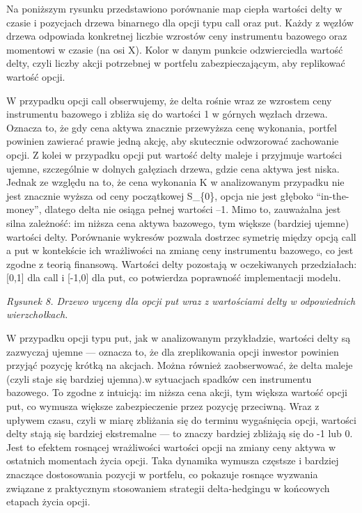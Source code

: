 \documentclass[
]{article}
\begin{document}
Na poniższym rysunku przedstawiono porównanie map ciepła wartości delty
w czasie i pozycjach drzewa binarnego dla opcji typu call oraz put.
Każdy z węzłów drzewa odpowiada konkretnej liczbie wzrostów ceny
instrumentu bazowego oraz momentowi w czasie (na osi X). Kolor w danym
punkcie odzwierciedla wartość delty, czyli liczby akcji potrzebnej w
portfelu zabezpieczającym, aby replikować wartość opcji.

W przypadku opcji call obserwujemy, że delta rośnie wraz ze wzrostem
ceny instrumentu bazowego i zbliża się do wartości 1 w górnych węzłach
drzewa. Oznacza to, że gdy cena aktywa znacznie przewyższa cenę
wykonania, portfel powinien zawierać prawie jedną akcję, aby skutecznie
odwzorować zachowanie opcji. Z kolei w przypadku opcji put wartość delty
maleje i przyjmuje wartości ujemne, szczególnie w dolnych gałęziach
drzewa, gdzie cena aktywa jest niska. Jednak ze względu na to, że cena
wykonania K w analizowanym przypadku nie jest znacznie wyższa od ceny
początkowej S\_\{0\}, opcja nie jest głęboko ``in-the-money'', dlatego
delta nie osiąga pełnej wartości --1. Mimo to, zauważalna jest silna
zależność: im niższa cena aktywa bazowego, tym większe (bardziej ujemne)
wartości delty. Porównanie wykresów pozwala dostrzec symetrię między
opcją call a put w kontekście ich wrażliwości na zmianę ceny instrumentu
bazowego, co jest zgodne z teorią finansową. Wartości delty pozostają w
oczekiwanych przedziałach: {[}0,1{]} dla call i {[}-1,0{]} dla put, co
potwierdza poprawność implementacji modelu.

\emph{Rysunek 8. Drzewo wyceny dla opcji put wraz z wartościami delty w
odpowiednich wierzchołkach.}

W przypadku opcji typu put, jak w analizowanym przykładzie, wartości
delty są zazwyczaj ujemne --- oznacza to, że dla zreplikowania opcji
inwestor powinien przyjąć pozycję krótką na akcjach. Można również
zaobserwować, że delta maleje (czyli staje się bardziej ujemna).w
sytuacjach spadków cen instrumentu bazowego. To zgodne z intuicją: im
niższa cena akcji, tym większa wartość opcji put, co wymusza większe
zabezpieczenie przez pozycję przeciwną. Wraz z upływem czasu, czyli w
miarę zbliżania się do terminu wygaśnięcia opcji, wartości delty stają
się bardziej ekstremalne --- to znaczy bardziej zbliżają się do -1 lub
0. Jest to efektem rosnącej wrażliwości wartości opcji na zmiany ceny
aktywa w ostatnich momentach życia opcji. Taka dynamika wymusza częstsze
i bardziej znaczące dostosowania pozycji w portfelu, co pokazuje rosnące
wyzwania związane z praktycznym stosowaniem strategii delta-hedgingu w
końcowych etapach życia opcji.
\end{document}
